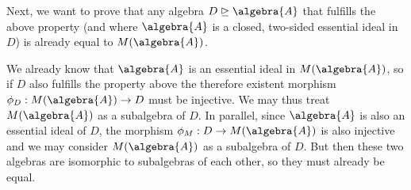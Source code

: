 \documentclass[a4paper]{article}
\begin{document}
Next, we want to prove that any algebra $D \trianglerighteq \algebra{A}$ that fulfills the above property (and where $\algebra{A}$ is a closed, two-sided essential ideal in $D$) is already equal to $M(\algebra{A})$.

We already know that $\algebra{A}$ is an essential ideal in $M(\algebra{A})$, so if $D$ also fulfills the property above the therefore existent morphism $\phi_D: M(\algebra{A}) \to D$ must be injective.
We may thus treat $M(\algebra{A})$ as a subalgebra of $D$.
In parallel, since $\algebra{A}$ is also an essential ideal of $D$, the morphism $\phi_M: D \to M(\algebra{A})$ is also injective and we may consider $M(\algebra{A})$ as a subalgebra of $D$.
But then these two algebras are isomorphic to subalgebras of each other, so they must already be equal.

\subsection{}
\end{document}
